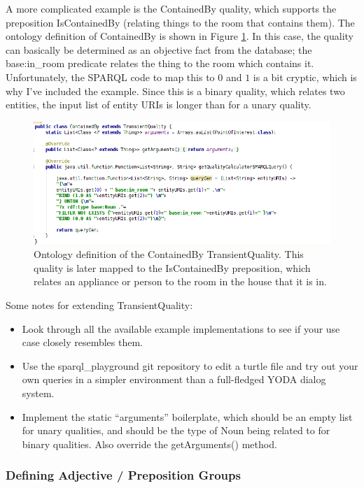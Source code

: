 \documentclass[titlepage]{article}
\begin{document}
A more complicated example is the ContainedBy quality, which supports the preposition IsContainedBy (relating things to the room that contains them).
The ontology definition of ContainedBy is shown in Figure \ref{fig:contained_by}.
In this case, the quality can basically be determined as an objective fact from the database; the base:in\_room predicate relates the thing to the room which contains it.
Unfortunately, the SPARQL code to map this to $0$ and $1$ is a bit cryptic, which is why I've included the example.
Since this is a binary quality, which relates two entities, the input list of entity URIs is longer than for a unary quality.\\

\begin{figure}[h!]
\centering
\includegraphics[width=\textwidth]{ContainedByQuality}
\caption{Ontology definition of the ContainedBy TransientQuality.
This quality is later mapped to the IsContainedBy preposition, which relates an appliance or person to the room in the house that it is in.}
\label{fig:contained_by}
\end{figure}



\noindent Some notes for extending TransientQuality:
\begin{itemize}
\item Look through all the available example implementations to see if your use case closely resembles them.
\item Use the sparql\_playground git repository to edit a turtle file and try out your own queries in a simpler environment than a full-fledged YODA dialog system.
\item Implement the static ``arguments'' boilerplate, which should be an empty list for unary qualities, and should be the type of Noun being related to for binary qualities. Also override the getArguments() method.
\end{itemize}


\subsubsection{Defining Adjective / Preposition Groups}
\end{document}
